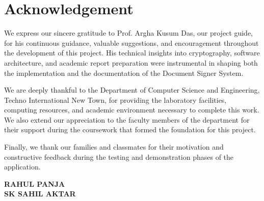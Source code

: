 \chapter*{Acknowledgement}

We express our sincere gratitude to Prof. Argha Kusum Das, our project guide, for his continuous guidance, valuable suggestions, and encouragement throughout the development of this project. His technical insights into cryptography, software architecture, and academic report preparation were instrumental in shaping both the implementation and the documentation of the Document Signer System.

We are deeply thankful to the Department of Computer Science and Engineering, Techno International New Town, for providing the laboratory facilities, computing resources, and academic environment necessary to complete this work. We also extend our appreciation to the faculty members of the department for their support during the coursework that formed the foundation for this project.

Finally, we thank our families and classmates for their motivation and constructive feedback during the testing and demonstration phases of the application.

\vspace{1cm}
\noindent
\textbf{RAHUL PANJA} \\
\textbf{SK SAHIL AKTAR}

\clearpage
